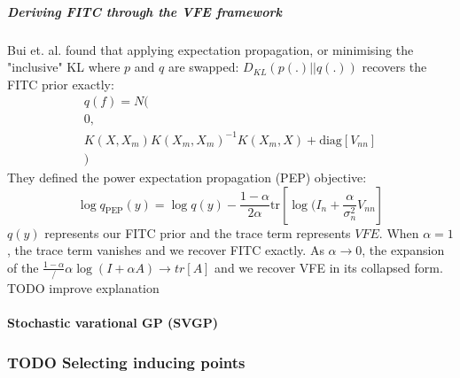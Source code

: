 \subparagraph{Deriving FITC through the VFE framework \cite{fitc-vfe-unifier}}
Bui et. al. found that applying expectation propagation, or minimising the "inclusive" KL where $p$ and $q$ are swapped: $D_{KL}(p(.) || q(.))$ recovers the FITC prior exactly:
\begin{equation*}
    \begin{aligned}
        q(f) = N ( \\
        0, \\
        K(X, X_m) K(X_m, X_m)^{-1} K(X_m, X) + \text{diag}[V_{nn}] \\
        )
    \end{aligned}
\end{equation*}
They defined the power expectation propagation (PEP) objective:
\begin{equation*}
    \log q_{\text{PEP}}(y) = \log q(y) - \frac{1 - \alpha}{2\alpha} \text{tr}\left[ \log(I_n + \frac{\alpha}{\sigma_n^2} V_{nn} \right]
\end{equation*}
$q(y)$ represents our FITC prior and the trace term represents $VFE$. When $\alpha = 1$, the trace term vanishes and we recover FITC exactly. As $\alpha \to 0$, the expansion of the $\frac{1-\alpha}/{\alpha} \log(I + \alpha A) \to tr[A]$ and we recover VFE in its collapsed form. \cite{fitc-vfe-unifier} TODO improve explanation


\paragraph{Stochastic varational GP (SVGP) \cite{svgp}}



\subsubsection{TODO Selecting inducing points}


% 
% 
% 


